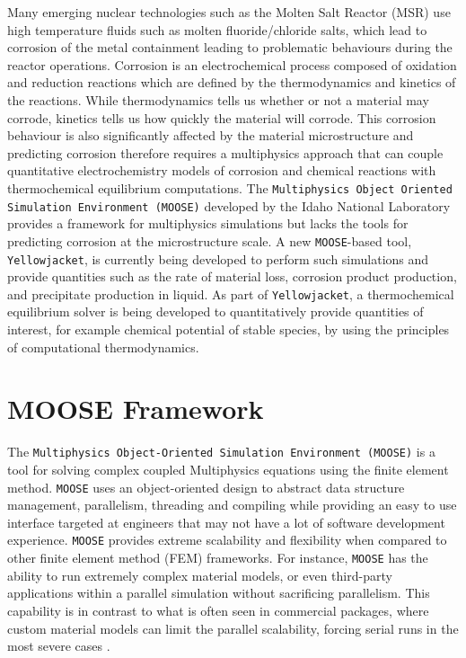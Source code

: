 Many emerging nuclear technologies such as the Molten Salt Reactor (MSR) use high temperature fluids such as molten fluoride/chloride salts, which lead to corrosion of the metal containment leading to problematic behaviours during the reactor operations. Corrosion is an electrochemical process composed of oxidation and reduction reactions which are defined by the thermodynamics and kinetics of the reactions. While thermodynamics tells us whether or not a material may corrode, kinetics tells us how quickly the material will corrode. This corrosion behaviour is also significantly affected by the material microstructure and predicting corrosion therefore requires a multiphysics approach that can couple quantitative electrochemistry models of corrosion and chemical reactions with thermochemical equilibrium computations. The \texttt{Multiphysics Object Oriented Simulation Environment (MOOSE)} developed by the Idaho National Laboratory provides a framework for multiphysics simulations but lacks the tools for predicting corrosion at the microstructure scale. A new \texttt{MOOSE}-based tool, \texttt{Yellowjacket}, is currently being developed to perform such simulations and provide quantities such as the rate of material loss, corrosion product production, and precipitate production in liquid. As part of \texttt{Yellowjacket}, a thermochemical equilibrium solver is being developed to quantitatively provide quantities of interest, for example chemical potential of stable species, by using the principles of computational thermodynamics.

\section*{MOOSE Framework}
    The \texttt{Multiphysics Object-Oriented Simulation Environment (MOOSE)} is a tool for solving complex coupled Multiphysics equations using the finite element method. \texttt{MOOSE} uses an object-oriented design to abstract data structure management, parallelism, threading and compiling while providing an easy to use interface targeted at engineers that may not have a lot of software development experience. \texttt{MOOSE} provides extreme scalability and flexibility when compared to other finite element method (FEM) frameworks. For instance, \texttt{MOOSE} has the ability to run extremely complex material models, or even third-party applications within a parallel simulation without sacrificing parallelism. This capability is in contrast to what is often seen in commercial packages, where custom material models can limit the parallel scalability, forcing serial runs in the most severe cases \cite{gaston2015physics,moose-web-page}.

